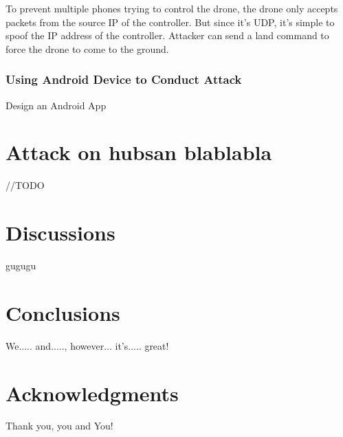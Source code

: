 \documentclass{acm_proc_article-sp}
\begin{document}
To prevent multiple phones trying to control the drone, the drone only accepts packets from the source IP of the controller. But since it's UDP, it's simple to spoof the IP address of the controller. Attacker can send a land command to force the drone to come to the ground.\cite{drone:python}

\subsubsection{Using Android Device to Conduct Attack}

Design an Android App



\section{Attack on hubsan blablabla}

//TODO

\section{Discussions}

gugugu


\section{Conclusions}

We..... and....., however... it's..... great!


\section{Acknowledgments}

Thank you, you and You!

%

%
%

\balancecolumns
\end{document}
